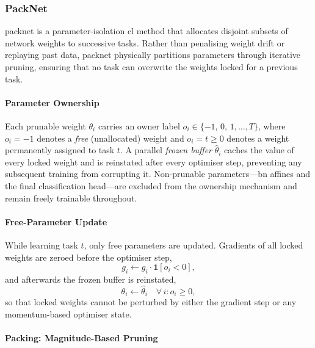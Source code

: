 \subsubsection{PackNet}

\gls{packnet} \cite{ll_packnet_2018} is a parameter-isolation \gls{cl} method
that allocates disjoint subsets of network weights to successive tasks. Rather
than penalising weight drift or replaying past data, \gls{packnet} physically
partitions parameters through iterative pruning, ensuring that no task can
overwrite the weights locked for a previous task.

\paragraph{Parameter Ownership}

Each prunable weight $\theta_i$ carries an owner label $o_i \in \{-1,\,0,\,1,
\ldots,T\}$, where $o_i = -1$ denotes a \emph{free} (unallocated) weight and
$o_i = t \geq 0$ denotes a weight permanently assigned to task $t$. A parallel
\emph{frozen buffer} $\hat\theta_i$ caches the value of every locked weight and
is reinstated after every optimiser step, preventing any subsequent training from
corrupting it. Non-prunable parameters---\gls{bn} affines and the final
classification head---are excluded from the ownership mechanism and remain freely
trainable throughout.

\paragraph{Free-Parameter Update}

While learning task $t$, only free parameters are updated. Gradients of all
locked weights are zeroed before the optimiser step,
%
\begin{equation}\label{eqn:packnet_grad_mask}
    g_i \leftarrow g_i \cdot \mathbf{1}[o_i < 0],
\end{equation}
%
and afterwards the frozen buffer is reinstated,
%
\begin{equation}\label{eqn:packnet_restore}
    \theta_i \leftarrow \hat\theta_i
    \quad \forall\, i : o_i \geq 0 ,
\end{equation}
%
so that locked weights cannot be perturbed by either the gradient step or any
momentum-based optimiser state.

\paragraph{Packing: Magnitude-Based Pruning}

